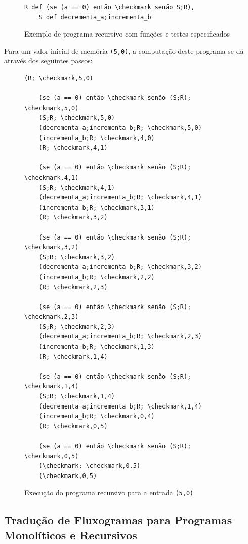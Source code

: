 \documentclass[12pt,fleqn]{article}
\begin{document}
\begin{figure}[H]
\begin{Verbatim}[commandchars=\\\{\},codes={\catcode`\$=3\catcode`\^=7}]
    R def (se (a == 0) então \checkmark senão S;R),
    S def decrementa_a;incrementa_b
\end{Verbatim}
\caption{Exemplo de programa recursivo com funções e testes especificados}
\end{figure}

\noindent
Para um valor inicial de memória \verb|(5,0)|, a computação deste programa se
dá através dos seguintes passos:

\begin{figure}[H]
\begin{Verbatim}[commandchars=\\\{\},codes={\catcode`\$=3\catcode`\^=7}]
    (R; \checkmark,5,0)

    (se (a == 0) então \checkmark senão (S;R); \checkmark,5,0)
    (S;R; \checkmark,5,0)
    (decrementa_a;incrementa_b;R; \checkmark,5,0)
    (incrementa_b;R; \checkmark,4,0)
    (R; \checkmark,4,1)

    (se (a == 0) então \checkmark senão (S;R); \checkmark,4,1)
    (S;R; \checkmark,4,1)
    (decrementa_a;incrementa_b;R; \checkmark,4,1)
    (incrementa_b;R; \checkmark,3,1)
    (R; \checkmark,3,2)

    (se (a == 0) então \checkmark senão (S;R); \checkmark,3,2)
    (S;R; \checkmark,3,2)
    (decrementa_a;incrementa_b;R; \checkmark,3,2)
    (incrementa_b;R; \checkmark,2,2)
    (R; \checkmark,2,3)

    (se (a == 0) então \checkmark senão (S;R); \checkmark,2,3)
    (S;R; \checkmark,2,3)
    (decrementa_a;incrementa_b;R; \checkmark,2,3)
    (incrementa_b;R; \checkmark,1,3)
    (R; \checkmark,1,4)

    (se (a == 0) então \checkmark senão (S;R); \checkmark,1,4)
    (S;R; \checkmark,1,4)
    (decrementa_a;incrementa_b;R; \checkmark,1,4)
    (incrementa_b;R; \checkmark,0,4)
    (R; \checkmark,0,5)

    (se (a == 0) então \checkmark senão (S;R); \checkmark,0,5)
    (\checkmark; \checkmark,0,5)
    (\checkmark,0,5)
\end{Verbatim}
\caption{Execução do programa recursivo para a entrada \texttt{(5,0)}}
\end{figure}

\subsection{Tradução de Fluxogramas para Programas Monolíticos e Recursivos}
\end{document}
